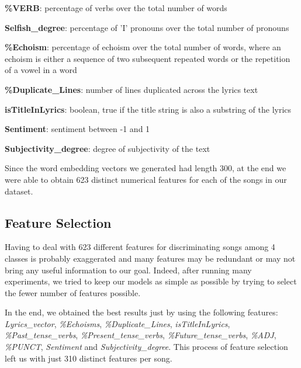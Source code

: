 \begin{description}
\item \textbf{\%VERB}: percentage of verbs over the total number of words
\item \textbf{Selfish\_degree}: percentage of 'I' pronouns over the total number of pronouns
\item \textbf{\%Echoism}: percentage of echoism over the total number of words, where an echoism is either a sequence of two subsequent repeated words or the repetition of a vowel in a word
\item \textbf{\%Duplicate\_Lines}: number of lines duplicated across the lyrics text
\item \textbf{isTitleInLyrics}: boolean, true if the title string is also a substring of the lyrics
\item \textbf{Sentiment}: sentiment between -1 and 1
\item \textbf{Subjectivity\_degree}: degree of subjectivity of the text
\end{description}

Since the word embedding vectors we generated had length 300, at the end we were able to obtain 623 distinct numerical features for each of the songs in our dataset.

\subsection{Feature Selection}

Having to deal with 623 different features for discriminating songs among 4 classes is probably exaggerated and many features may be redundant or may not bring any useful information to our goal. Indeed, after running many experiments, we tried to keep our models as simple as possible by trying to select the fewer number of features possible.

In the end, we obtained the best results just by using the following features: \textit{Lyrics\_vector}, \textit{\%Echoisms}, \textit{\%Duplicate\_Lines}, \textit{isTitleInLyrics}, \textit{\%Past\_tense\_verbs}, \textit{\%Present\_tense\_verbs}, \textit{\%Future\_tense\_verbs}, \textit{\%ADJ}, \textit{\%PUNCT}, \textit{Sentiment} and \textit{Subjectivity\_degree}. This process of feature selection left us with just 310 distinct features per song.

